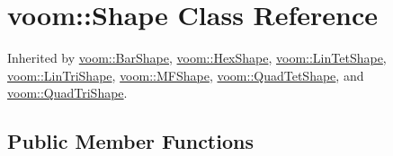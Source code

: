 \hypertarget{classvoom_1_1_shape}{
\section{voom::Shape Class Reference}
\label{classvoom_1_1_shape}
}


Inherited by \hyperlink{classvoom_1_1_bar_shape}{voom::BarShape}, \hyperlink{classvoom_1_1_hex_shape}{voom::HexShape}, \hyperlink{classvoom_1_1_lin_tet_shape}{voom::LinTetShape}, \hyperlink{classvoom_1_1_lin_tri_shape}{voom::LinTriShape}, \hyperlink{classvoom_1_1_m_f_shape}{voom::MFShape}, \hyperlink{classvoom_1_1_quad_tet_shape}{voom::QuadTetShape}, and \hyperlink{classvoom_1_1_quad_tri_shape}{voom::QuadTriShape}.\subsection*{Public Member Functions}
